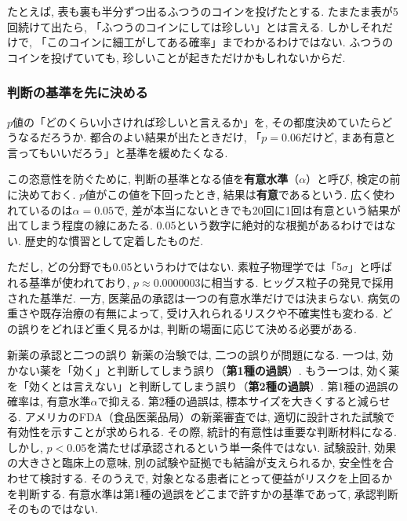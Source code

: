     たとえば, 表も裏も半分ずつ出るふつうのコインを投げたとする.
    たまたま表が5回続けて出たら, 「ふつうのコインにしては珍しい」とは言える.
    しかしそれだけで, 「このコインに細工がしてある確率」までわかるわけではない.
    ふつうのコインを投げていても, 珍しいことが起きただけかもしれないからだ.

    \subsubsection*{判断の基準を先に決める}

    $p$値の「どのくらい小さければ珍しいと言えるか」を, その都度決めていたらどうなるだろうか.
    都合のよい結果が出たときだけ, 「$p = 0.06$だけど, まあ有意と言ってもいいだろう」と基準を緩めたくなる.

    この恣意性を防ぐために, 判断の基準となる値を\textbf{有意水準}（$\alpha$）と呼び, 検定の前に決めておく.
    $p$値がこの値を下回ったとき, 結果は\textbf{有意}であるという.
    広く使われているのは$\alpha = 0.05$で, 差が本当にないときでも20回に1回は有意という結果が出てしまう程度の線にあたる.
    0.05という数字に絶対的な根拠があるわけではない.
    歴史的な慣習として定着したものだ.

    ただし, どの分野でも0.05というわけではない.
    素粒子物理学では「5$\sigma$」と呼ばれる基準が使われており, $p \approx 0.0000003$に相当する.
    ヒッグス粒子の発見で採用された基準だ.
    一方, 医薬品の承認は一つの有意水準だけでは決まらない.
    病気の重さや既存治療の有無によって, 受け入れられるリスクや不確実性も変わる.
    どの誤りをどれほど重く見るかは, 判断の場面に応じて決める必要がある.

    \begin{mybox}{新薬の承認と二つの誤り}
      新薬の治験では, 二つの誤りが問題になる.
      一つは, 効かない薬を「効く」と判断してしまう誤り（\textbf{第1種の過誤}）.
      もう一つは, 効く薬を「効くとは言えない」と判断してしまう誤り（\textbf{第2種の過誤}）.
      第1種の過誤の確率は, 有意水準$\alpha$で抑える.
      第2種の過誤は, 標本サイズを大きくすると減らせる.
      アメリカのFDA（食品医薬品局）の新薬審査では, 適切に設計された試験で有効性を示すことが求められる.
      その際, 統計的有意性は重要な判断材料になる.
      しかし, $p < 0.05$を満たせば承認されるという単一条件ではない.
      試験設計, 効果の大きさと臨床上の意味, 別の試験や証拠でも結論が支えられるか, 安全性を合わせて検討する.
      そのうえで, 対象となる患者にとって便益がリスクを上回るかを判断する.\footnotemark
      有意水準は第1種の過誤をどこまで許すかの基準であって, 承認判断そのものではない.
    \end{mybox}

